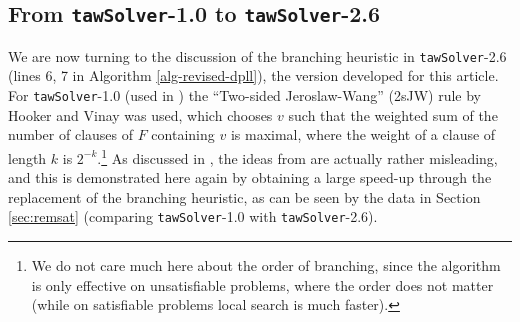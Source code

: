 \documentclass[final,3p,times]{elsarticle}
\theoremstyle{definition}
\newcommand{\tawsolver}{\texttt{tawSolver}}
\newcommand{\otawsolver}{\tawsolver-1.0}
\newcommand{\ntawsolver}{\tawsolver-2.6}
\begin{document}
\subsection{From \otawsolver{} to \ntawsolver}
\label{sec:tawsolver1020}

We are now turning to the discussion of the branching heuristic in \ntawsolver{} (lines 6, 7 in Algorithm \ref{alg-revised-dpll}), the version developed for this article. For \otawsolver{} (used in \cite{ahmed2009,ahmed2010}) the ``Two-sided Jeroslaw-Wang'' (2sJW) rule by Hooker and Vinay \cite{hv95} was used, which chooses $v$ such that the weighted sum of the number of clauses of $F$ containing $v$ is maximal, where the weight of a clause of length $k$ is $2^{-k}$.\footnote{We do not care much here about the order of branching, since the algorithm is only effective on unsatisfiable problems, where the order does not matter (while on satisfiable problems local search is much faster).} As discussed in \cite{Kullmann2007HandbuchTau}, the ideas from \cite{hv95} are actually rather misleading, and this is demonstrated here again by obtaining a large speed-up through the replacement of the branching heuristic, as can be seen by the data in Section \ref{sec:remsat} (comparing \otawsolver{} with \ntawsolver).
\end{document}
